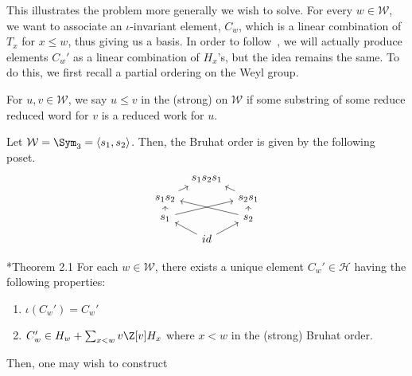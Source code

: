 \documentclass[11pt,leqno,oneside]{amsart}
\numberwithin{thm}{section}
\renewcommand{\W}{\mathcal{W}}
\renewcommand{\H}{\mathcal{H}} %
\begin{document}
 This illustrates the problem more generally we wish to solve. For
 every \(w \in \W\), we want to associate an \(\iota\)-invariant
 element, \(C_w\), which is a linear combination of \(T_x\) for \(x
 \leq w\), thus giving us a basis. In order to follow~\cite{soergel},
 we will actually produce elements \(C_w'\) as a linear combination of
 \(H_x\)'s, but the idea remains the same. To do this, we first recall
 a partial ordering on the Weyl group.
 \begin{defn}
   For \(u,v \in \W\), we say \(u \leq v\) in the (strong)  on \(\W\) if some substring of some reduce reduced word
   for \(v\) is a reduced work for \(u\).
 \end{defn}
 \begin{example}
   Let \(\W = \Sym_3 = \langle s_1, s_2 \rangle\). Then, the Bruhat
   order is given by the following poset. \[
     \begin{tikzcd}[row sep=tiny, column sep=tiny]
       & s_1s_2s_1 & \\
       s_1 s_2 \ar[ur] & & s_2 s_1 \ar[ul]\\
       s_1 \ar[u] \ar[urr]& & s_2 \ar[u] \ar[ull]\\
       & id \ar[ul] \ar[ur]&
     \end{tikzcd}
   \]
 \end{example}
\begin{thm}\label{thm:KL}
  \cite{soergel}*{Theorem 2.1} For each \(w \in \W\), there exists a
  unique element \(C_w' \in \H\) having the following properties:
  \begin{enumerate}
  \item \(\iota(C_w') = C_w'\) 
  \item \(C_w' \in H_w + \sum_{x < w} v \Z[v] H_x\) where \(x < w\) in
    the (strong) Bruhat order.
  \end{enumerate}
\end{thm}
Then, one may wish to construct 
\end{document}
